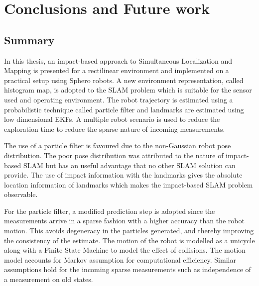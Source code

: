 \chapter{Conclusions and Future work}  \label{chap::conclusion}

\section{Summary}
In this thesis, an impact-based approach to Simultaneous Localization and Mapping is presented for a rectilinear environment and implemented on a practical setup using Sphero robots. A new environment representation, called histogram map, is adopted to the SLAM problem which is suitable for the sensor used and operating environment. The robot trajectory is estimated using a probabilistic technique called particle filter and landmarks are estimated using low dimensional EKFs. A multiple robot scenario is used to reduce the exploration time to reduce the sparse nature of incoming measurements.

The use of a particle filter is favoured due to the non-Gaussian robot pose distribution. The poor pose distribution was attributed to the nature of impact-based SLAM but has an useful advantage that no other SLAM solution can provide. The use of impact information with the landmarks gives the absolute location information of landmarks which makes the impact-based SLAM problem observable.  

For the particle filter, a modified prediction step is adopted since the measurements arrive in a sparse fashion with a higher accuracy than the robot motion. This avoids degeneracy in the particles generated, and thereby improving the consistency of the estimate. The motion of the robot is modelled as a unicycle along with a Finite State Machine to model the effect of collisions. The motion model accounts for Markov assumption for computational efficiency. Similar assumptions hold for the incoming sparse measurements such as independence of a measurement on old states.

